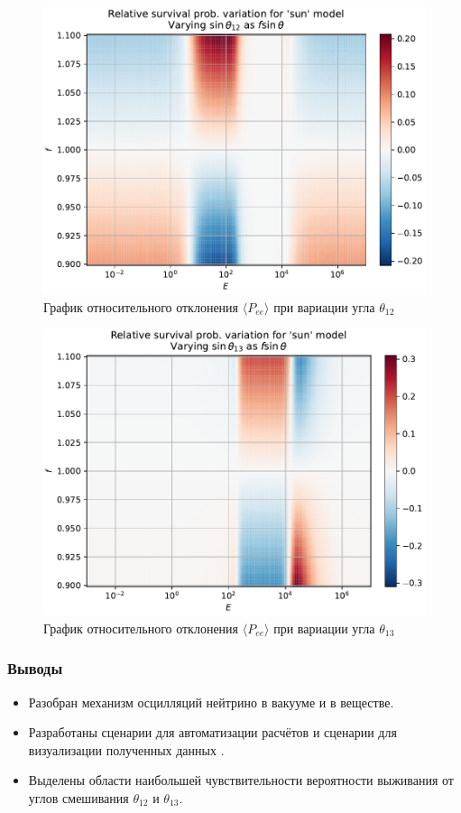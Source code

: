 \documentclass[utf8,9pt,mathserif,usepdftitle=false]{beamer}
\begin{document}
\begin{frame}
	\begin{figure}[h]
		\centering
		\includegraphics[width=0.8\linewidth]{sun-in-ang12}
		\caption{График относительного отклонения \(\langle P_{ee}\rangle\) при
      вариации угла \(\theta_{12}\) }
	\end{figure}
\end{frame}

\begin{frame}
	\begin{figure}[h]
		\centering
		\includegraphics[width=0.8\linewidth]{sun-in-ang13}
		\caption{График относительного отклонения \(\langle P_{ee}\rangle\) при
      вариации угла \(\theta_{13}\)}
	\end{figure}
\end{frame}

\begin{frame}
	\frametitle{Выводы}
	\begin{itemize}
  \item<1-> Разобран механизм осцилляций нейтрино в вакууме и в веществе.
  \item<2-> Разработаны сценарии для автоматизации расчётов и сценарии для
    визуализации полученных данных .
   \item<3-> Выделены области наибольшей чувствительности вероятности выживания от 
   углов смешивания \(\theta_{12}\) и \(\theta_{13}\).
	\end{itemize}
\end{frame}
\end{document}
